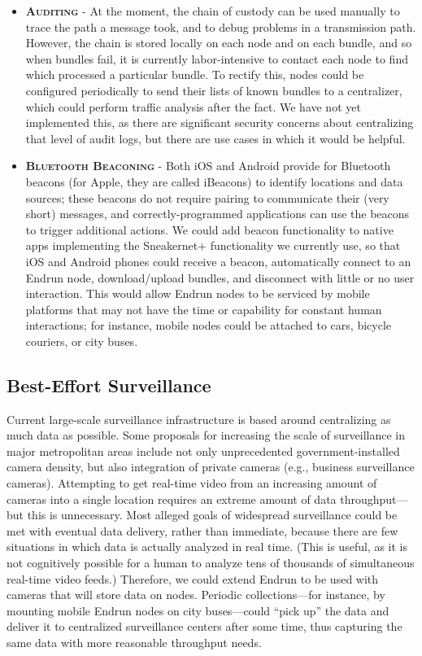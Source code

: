 \documentclass[12pt]{article}
\begin{document}
  \begin{itemize}
    \item \textbf{\textsc{Auditing}} - At the moment, the chain of custody can be used manually to trace the path a message took, and to debug problems in a transmission path. However, the chain is stored locally on each node and on each bundle, and so when bundles fail, it is currently labor-intensive to contact each node to find which processed a particular bundle. To rectify this, nodes could be configured periodically to send their lists of known bundles to a centralizer, which could perform traffic analysis after the fact. We have not yet implemented this, as there are significant security concerns about centralizing that level of audit logs, but there are use cases in which it would be helpful.
    
    \item \textbf{\textsc{Bluetooth Beaconing}} - Both iOS and Android provide for Bluetooth beacons (for Apple, they are called iBeacons) to identify locations and data sources; these beacons do not require pairing to communicate their (very short) messages, and correctly-programmed applications can use the beacons to trigger additional actions. We could add beacon functionality to native apps implementing the Sneakernet+ functionality we currently use, so that iOS and Android phones could receive a beacon, automatically connect to an Endrun node, download/upload bundles, and disconnect with little or no user interaction. This would allow Endrun nodes to be serviced by mobile platforms that may not have the time or capability for constant human interactions; for instance, mobile nodes could be attached to cars, bicycle couriers, or city buses.
  \end{itemize}
  
  \subsection{Best-Effort Surveillance}
  
  Current large-scale surveillance infrastructure is based around centralizing as much data as possible. Some proposals for increasing the scale of surveillance in major metropolitan areas include not only unprecedented government-installed camera density, but also integration of private cameras (e.g., business surveillance cameras). Attempting to get real-time video from an increasing amount of cameras into a single location requires an extreme amount of data throughput---but this is unnecessary. Most alleged goals of widespread surveillance could be met with eventual data delivery, rather than immediate, because there are few situations in which data is actually analyzed in real time. (This is useful, as it is not cognitively possible for a human to analyze tens of thousands of simultaneous real-time video feeds.) Therefore, we could extend Endrun to be used with cameras that will store data on nodes. Periodic collections---for instance, by mounting mobile Endrun nodes on city buses---could ``pick up'' the data and deliver it to centralized surveillance centers after some time, thus capturing the same data with more reasonable throughput needs.
  
\end{document}
